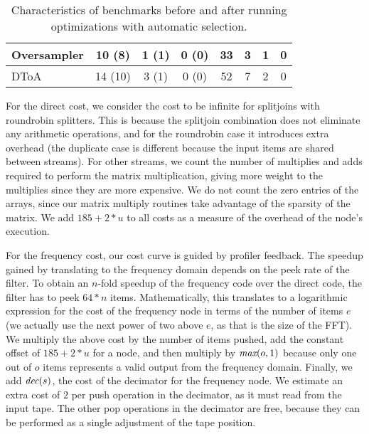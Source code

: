 \documentclass{sig-alternate}
\begin{document}
{\begin{table}[t]
\begin{minipage}{7in}
\begin{center}
{\begin{tabular}{|l|c|c|c||c||c|c|c|}
\hline
Oversampler& 10 (8) & 1 (1)     & 0 (0)      & 33          & 3            & 1                 & 0 \\
\hline
DToA       & 14 (10) & 3 (1)    & 0 (0)      & 52          & 7            & 2                 & 0 \\
\hline
\end{tabular}}
\vspace{-3pt}
\caption{Characteristics of benchmarks before and after running optimizations with automatic selection.
\protect\label{fig:benchmark-statistics}}
\end{center}
\vspace{-20pt}
\makeline
\vspace{-12pt}
\end{minipage}
\end{table}

For the direct cost, we consider the cost to be infinite for
splitjoins with roundrobin splitters.  This is because the splitjoin
combination does not eliminate any arithmetic operations, and for the
roundrobin case it introduces extra overhead (the duplicate case is
different because the input items are shared between streams).  For
other streams, we count the number of multiplies and adds required to
perform the matrix multiplication, giving more weight to the
multiplies since they are more expensive.  We do not count the zero
entries of the arrays, since our matrix multiply routines take
advantage of the sparsity of the matrix.  We add $185+2*u$ to all
costs as a measure of the overhead of the node's execution.

For the frequency cost, our cost curve is guided by profiler feedback.
The speedup gained by translating to the frequency domain depends on
the peek rate of the filter.  To obtain an $n$-fold speedup of the
frequency code over the direct code, the filter has to peek $64*n$
items.  Mathematically, this translates to a logarithmic expression
for the cost of the frequency node in terms of the number of items $e$
(we actually use the next power of two above $e$, as that is the size
of the FFT).  We multiply the above cost by the number of items pushed,
add the constant offset of $185+2*u$ for a node, and then multiply by
$\mbox{\it max}(o, 1)$ because only one out of $o$ items represents a valid
output from the frequency domain.  Finally, we add $\mbox{\it dec}(s)$, the
cost of the decimator for the frequency node.  We estimate an extra
cost of $2$ per push operation in the decimator, as it must read from
the input tape.  The other pop operations in the decimator are free,
because they can be performed as a single adjustment of the tape
position.

}
\end{document}
